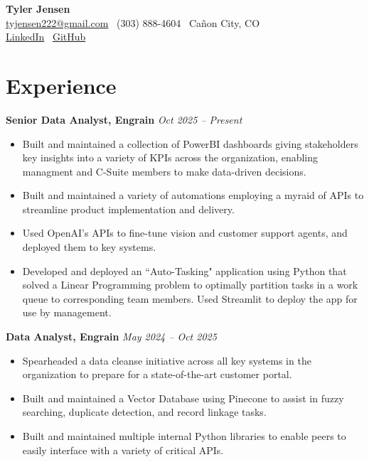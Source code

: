 \documentclass[a4paper,10pt]{article}
\newcommand{\resumeEntry}[2]{%
  \noindent\textbf{#1} \hfill \textit{#2}\par\vspace{-0.5ex}%
}
\begin{document}
\pagestyle{empty}
\small

\begin{center}
    {\LARGE \textbf{Tyler Jensen}}\\[2mm]
    \small
    \href{mailto:tyjensen222@gmail.com}{tyjensen222@gmail.com} \textbullet\ 
    (303) 888-4604 \textbullet\ Ca\~{n}on City, CO \\
    \href{https://www.linkedin.com/in/tyler-jensen-923130181}{LinkedIn} \textbullet\ 
    \href{https://github.com/yourprofile}{GitHub}
\end{center}

\vspace{0.25cm}

\section*{Experience}

\resumeEntry{Senior Data Analyst, Engrain}{Oct 2025 -- Present}
\begin{itemize}[leftmargin=*, noitemsep]
    \item Built and maintained a collection of PowerBI dashboards giving stakeholders key insights into a variety of
    KPIs across the organization, enabling managment and C-Suite members to make data-driven decisions.
    \item Built and maintained a variety of automations employing a myraid of APIs to streamline product implementation
    and delivery.
    \item Used OpenAI's APIs to fine-tune vision and customer support agents, and deployed them to key systems.
    \item Developed and deployed an ``Auto-Tasking" application using Python that solved a Linear Programming problem to optimally
    partition tasks in a work queue to corresponding team members.
    Used Streamlit to deploy the app for use by management.
\end{itemize}

\resumeEntry{Data Analyst, Engrain}{May 2024 -- Oct 2025}
\begin{itemize}[leftmargin=*, noitemsep]
    \item Spearheaded a data cleanse initiative across all key systems in the organization to prepare for 
    a state-of-the-art customer portal.
    \item Built and maintained a Vector Database using Pinecone to assist in fuzzy searching, duplicate detection, and record linkage tasks.
    \item Built and maintained multiple internal Python libraries to enable peers to easily interface
    with a variety of critical APIs.
\end{itemize}
\end{document}
